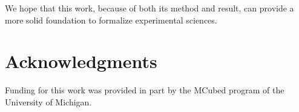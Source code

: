 \documentclass[preprint]{elsarticle}
\theoremstyle{plain}%
\theoremstyle{definition}
\theoremstyle{remark}
\begin{document}
We hope that this work, because of both its method and result, can provide a more solid foundation to formalize experimental sciences.

\section*{Acknowledgments}
Funding for this work was provided in part by the MCubed program of the University of Michigan.



\end{document}
